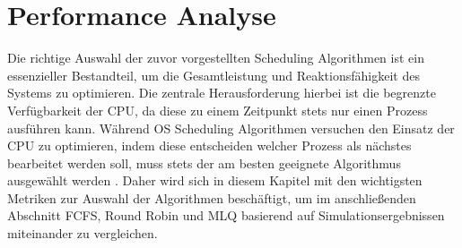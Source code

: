 \chapter{Performance Analyse}
Die richtige Auswahl der zuvor vorgestellten Scheduling Algorithmen ist ein essenzieller Bestandteil, um die Gesamtleistung und Reaktionsfähigkeit des Systems zu optimieren. Die zentrale Herausforderung hierbei ist die begrenzte Verfügbarkeit der \ac{CPU}, da diese zu einem Zeitpunkt stets nur einen Prozess ausführen kann. Während OS Scheduling Algorithmen versuchen den Einsatz der \ac{CPU} zu optimieren, indem diese entscheiden welcher Prozess als nächstes bearbeitet werden soll, muss stets der am besten geeignete Algorithmus ausgewählt werden \autocite{goel_comparative_2013}. Daher wird sich in diesem Kapitel mit den wichtigsten Metriken zur Auswahl der Algorithmen beschäftigt, um im anschließenden Abschnitt \ac{FCFS}, Round Robin und \ac{MLQ} basierend auf Simulationsergebnissen miteinander zu vergleichen.